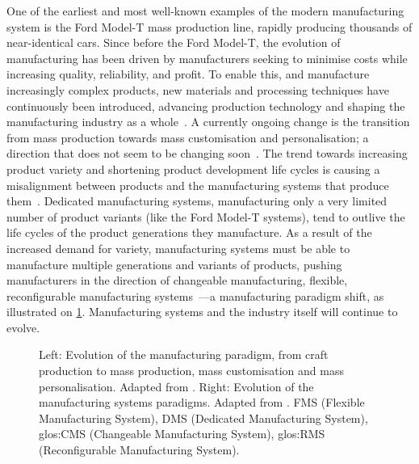 One of the earliest and most well-known examples of the modern manufacturing system is the Ford Model-T mass production line, rapidly producing thousands of near-identical cars.
Since before the Ford Model-T, the evolution of manufacturing has been driven by manufacturers seeking to minimise costs while increasing quality, reliability, and profit.
To enable this, and manufacture increasingly complex products, new materials and processing techniques have continuously been introduced, advancing production technology and shaping the manufacturing industry as a whole~\parencite{ElMaraghySmartChange}.
A currently ongoing change is the transition from mass production towards mass customisation and personalisation; a direction that does not seem to be changing soon~\parencite{Salvador_MITSMR}.
The trend towards increasing product variety and shortening product development life cycles is causing a misalignment between products and the manufacturing systems that produce them~\parencite{HodaC}.
Dedicated manufacturing systems, manufacturing only a very limited number of product variants (like the Ford Model-T systems), tend to outlive the life cycles of the product generations they manufacture.
As a result of the increased demand for variety, manufacturing systems must be able to manufacture multiple generations and variants of products, pushing manufacturers in the direction of changeable manufacturing, \eg{} flexible, reconfigurable manufacturing systems~\parencite{WIENDAHL2007783,ElMaraghy2013629}---a manufacturing paradigm shift, as illustrated on \cref{fig:evoMfgPara}.
Manufacturing systems and the industry itself will continue to evolve.
\begin{figure}[tb]
	\centering
	\caption[Evolution of the manufacturing and manufacturing system paradigms.]
	{Left: Evolution of the manufacturing paradigm, from craft production to mass production, mass customisation and mass personalisation.
	Adapted from \textcite{KorenGlobalManRev}.
	Right: Evolution of the manufacturing systems paradigms.
	Adapted from \textcite{ElMaraghy2013629}.
	FMS (Flexible Manufacturing System), DMS (Dedicated Manufacturing System), \gls{glos:CMS} (Changeable Manufacturing System), \gls{glos:RMS} (Reconfigurable Manufacturing System).}\label{fig:evoMfgPara}
\end{figure}

